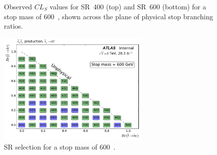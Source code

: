 \begin{figure}[ht]
  \centering
  \caption{
    Observed
    $CL_S$ values for SR~400 (top) and SR~600 (bottom) for a stop mass of
    600~\GeV,
    shown across the plane of physical stop branching ratios.
  }
\end{figure}

\begin{figure}[ht]
  \centering
  \includegraphics[width=0.65\textwidth]
    {figs/blstop/region_selection/region_choice_vs_br_m_600.pdf}
  \caption{
    SR selection for a stop mass of 600~\GeV.
  }
\end{figure}

